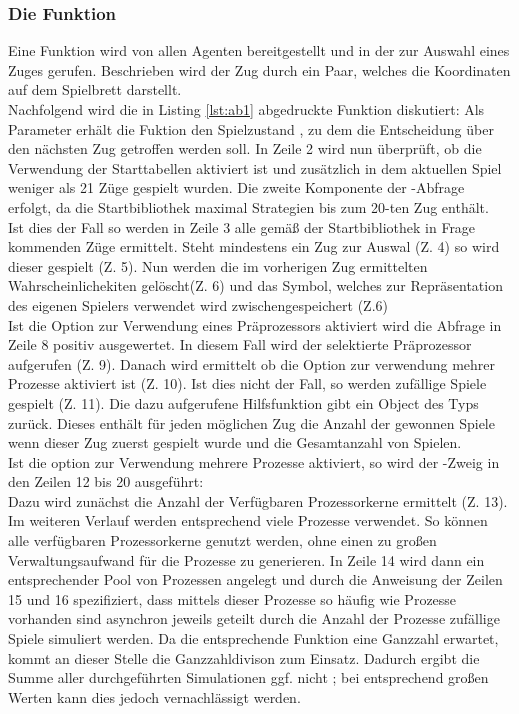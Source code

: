 \subsubsection{Die Funktion }
\label{mc-getmove}
Eine Funktion  wird von allen Agenten bereitgestellt und in der  zur Auswahl eines Zuges gerufen. Beschrieben wird der Zug durch ein Paar, welches die Koordinaten auf dem Spielbrett darstellt.
\\Nachfolgend wird die in Listing \ref{lst:ab1} abgedruckte Funktion diskutiert:
\vspace{0.5cm}
Als Parameter erhält die Fuktion den Spielzustand , zu dem die Entscheidung über den nächsten Zug getroffen werden soll. In Zeile 2 wird nun überprüft, ob die Verwendung der Starttabellen aktiviert ist und zusätzlich in dem aktuellen Spiel weniger als 21 Züge gespielt wurden. Die zweite Komponente der -Abfrage erfolgt, da die Startbibliothek maximal Strategien bis zum 20-ten Zug enthält.
\\Ist dies der Fall so werden in Zeile 3 alle gemäß der Startbibliothek in Frage kommenden Züge ermittelt. Steht mindestens ein Zug zur Auswal (Z. 4) so wird dieser gespielt (Z. 5). Nun werden die im vorherigen Zug ermittelten Wahrscheinlichekiten gelöscht(Z. 6) und das Symbol, welches zur Repräsentation des eigenen Spielers verwendet wird zwischengespeichert (Z.6)
\\Ist die Option zur Verwendung eines Präprozessors aktiviert wird die Abfrage in Zeile 8 positiv ausgewertet. In diesem Fall wird der selektierte Präprozessor aufgerufen (Z. 9). Danach wird ermittelt ob die Option zur verwendung mehrer Prozesse aktiviert ist (Z. 10). Ist dies nicht der Fall, so werden  zufällige Spiele gespielt (Z. 11). Die dazu aufgerufene Hilfsfunktion gibt ein Object des Typs  zurück. Dieses enthält für jeden möglichen Zug die Anzahl der gewonnen Spiele wenn dieser Zug zuerst gespielt wurde und die Gesamtanzahl von Spielen.\\
Ist die option zur Verwendung mehrere Prozesse aktiviert, so wird der -Zweig in den Zeilen 12 bis 20 ausgeführt:
\\Dazu wird zunächst die Anzahl der Verfügbaren Prozessorkerne ermittelt (Z. 13). Im weiteren Verlauf werden entsprechend viele Prozesse verwendet. So können alle verfügbaren Prozessorkerne genutzt werden, ohne einen zu großen Verwaltungsaufwand für die Prozesse zu generieren. In Zeile 14 wird dann ein entsprechender Pool von Prozessen angelegt und durch die Anweisung der Zeilen 15 und 16 spezifiziert, dass mittels dieser Prozesse so häufig wie Prozesse vorhanden sind asynchron jeweils  geteilt durch die Anzahl der Prozesse zufällige Spiele simuliert werden. Da die entsprechende Funktion eine Ganzzahl erwartet, kommt an dieser Stelle die Ganzzahldivison \code{//} zum Einsatz. Dadurch ergibt die Summe aller durchgeführten Simulationen ggf. nicht ; bei entsprechend großen Werten kann dies jedoch vernachlässigt werden.

